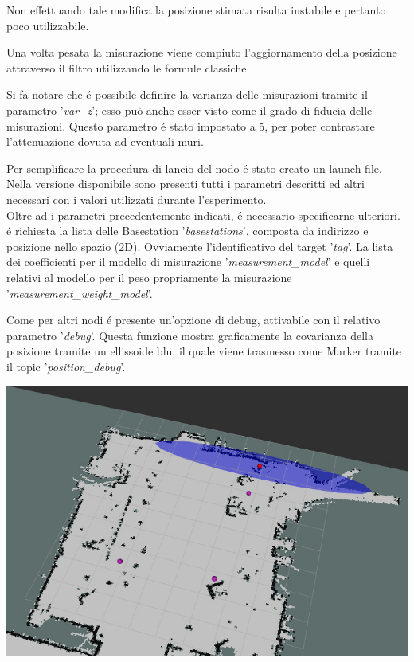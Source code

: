 \documentclass{article}
\begin{document}
Non effettuando tale modifica la posizione stimata risulta instabile e pertanto poco utilizzabile.


Una volta pesata la misurazione viene compiuto l'aggiornamento della posizione attraverso il filtro utilizzando le formule classiche.

Si fa notare che \'e possibile definire la varianza delle misurazioni tramite il parametro '\textit{var\_z}'; esso pu\`o anche esser visto come il grado di fiducia delle misurazioni.
Questo parametro \'e stato impostato a 5, per poter contrastare l'attenuazione dovuta ad eventuali muri.


Per semplificare la procedura di lancio del nodo \'e stato creato un launch file.
Nella versione disponibile sono presenti tutti i parametri descritti ed altri necessari con i valori utilizzati durante l'esperimento.\\

Oltre ad i parametri precedentemente indicati, \'e necessario specificarne ulteriori.
\'e richiesta la lista delle Basestation '\textit{basestations}', composta da indirizzo e posizione nello spazio (2D).
Ovviamente l'identificativo del target '\textit{tag}'.
La lista dei coefficienti per il modello di misurazione '\textit{measurement\_model}' e quelli relativi al modello per il peso propriamente la misurazione '\textit{measurement\_weight\_model}'.

Come per altri nodi \'e presente un'opzione di debug, attivabile con il relativo parametro '\textit{debug}'.
Questa funzione mostra graficamente la covarianza della posizione tramite un ellissoide blu, il quale viene trasmesso come Marker tramite il topic '\textit{position\_debug}'.

\begin{center}
	\includegraphics[scale=0.4]{manual_imgs/position_debug}
\end{center}
\end{document}
